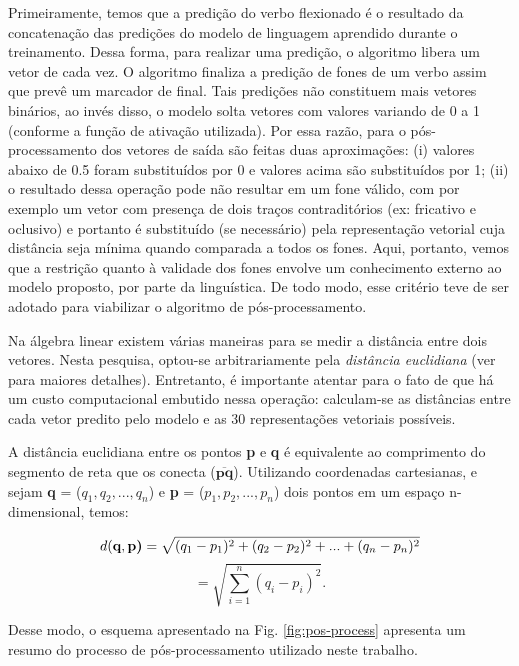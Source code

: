 Primeiramente, temos que a predição do verbo flexionado é o resultado da concatenação das predições do modelo de linguagem aprendido durante o treinamento. Dessa forma, para realizar uma predição, o algoritmo libera um vetor de cada vez. O algoritmo finaliza a predição de fones de um verbo assim que prevê um marcador de final. Tais predições não constituem mais vetores binários, ao invés disso, o modelo solta vetores com valores variando de 0 a 1 (conforme a função de ativação utilizada). Por essa razão, para o pós-processamento dos vetores de saída são feitas duas aproximações: (i) valores abaixo de 0.5 foram substituídos por 0 e valores acima são substituídos por 1; (ii) o resultado dessa operação pode não resultar em um fone válido, com por exemplo um vetor com presença de dois traços contraditórios (ex: fricativo e oclusivo) e portanto é substituído (se necessário) pela representação vetorial cuja distância seja mínima quando comparada a todos os fones. Aqui, portanto, vemos que a restrição quanto à validade dos fones envolve um conhecimento externo ao modelo proposto, por parte da linguística. De todo modo, esse critério teve de ser adotado para viabilizar o algoritmo de pós-processamento. 

Na álgebra linear existem várias maneiras para se medir a distância entre dois vetores. Nesta pesquisa, optou-se arbitrariamente pela \textit{distância euclidiana} (ver \cite{boulos2009geometria} para maiores detalhes). Entretanto, é importante atentar para o fato de que há um custo computacional embutido nessa operação: calculam-se as distâncias entre cada vetor predito pelo modelo e as 30 representações vetoriais possíveis. 

A distância euclidiana entre os pontos \textbf{p} e \textbf{q} é equivalente ao comprimento do segmento de reta que os conecta (${\displaystyle {\overline {\mathbf {p} \mathbf {q} }}}$). Utilizando coordenadas cartesianas, e sejam \textbf{q} = ($q_1, q_2, ..., q_n$) e \textbf{p} = ($p_1, p_2, ..., p_n$) dois pontos em um espaço n-dimensional, temos:

\begin{equation}
    d(\textbf{q}, \textbf{p)} = \sqrt{(q_1 - p_1)^2 + (q_2 - p_2)^2 + ... + (q_n - p_n)^2}\notag
\end{equation}
\begin{equation}
    = \sqrt{\sum_{i=1}^n (q_i-p_i)^2}.    
\end{equation}

Desse modo, o esquema apresentado na Fig. \ref{fig:pos-process} apresenta um resumo do processo de pós-processamento utilizado neste trabalho.


 





